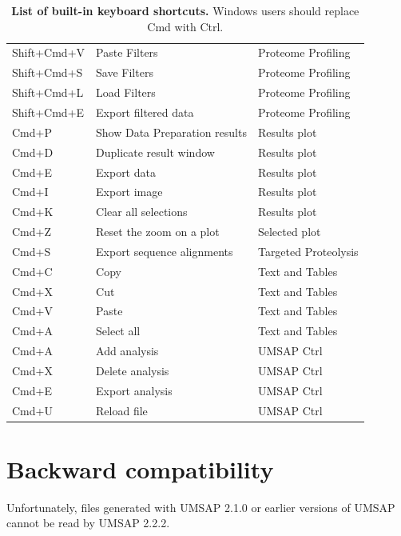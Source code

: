 \begin{table}[h!]
\begin{tabular}{l l l}
        Shift+Cmd+V&Paste Filters                      &Proteome Profiling\\
        Shift+Cmd+S&Save Filters                       &Proteome Profiling\\
        Shift+Cmd+L&Load Filters                       &Proteome Profiling\\
        Shift+Cmd+E&Export filtered data               &Proteome Profiling\\
        Cmd+P      &Show Data Preparation results      &Results plot\\
        Cmd+D      &Duplicate result window            &Results plot\\
        Cmd+E      &Export data                        &Results plot\\
        Cmd+I      &Export image                       &Results plot\\
        Cmd+K      &Clear all selections               &Results plot\\
        Cmd+Z      &Reset the zoom       on a plot     &Selected plot\\
        Cmd+S      &Export sequence alignments         &Targeted Proteolysis\\
        Cmd+C      &Copy                               &Text and Tables\\
        Cmd+X      &Cut                                &Text and Tables\\
        Cmd+V      &Paste                              &Text and Tables\\
        Cmd+A      &Select all                         &Text and Tables\\
        Cmd+A      &Add analysis                       &UMSAP Ctrl\\
        Cmd+X      &Delete analysis                    &UMSAP Ctrl\\
        Cmd+E      &Export analysis                    &UMSAP Ctrl\\
        Cmd+U      &Reload file                        &UMSAP Ctrl\\
        \hline
    \end{tabular}
    \caption[List of built-in keyboard shortcuts]{\textbf{List of built-in keyboard
    shortcuts.} Windows users should replace Cmd with Ctrl.}
    \label{table:shortcuts}
\end{table}

\section{Backward compatibility}
\label{sec:backwardCompatibility}

Unfortunately, files generated with UMSAP 2.1.0 or earlier versions of UMSAP
cannot be read by UMSAP 2.2.2.